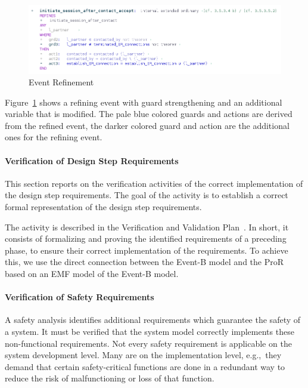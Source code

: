 \begin{figure}[ht]
  \centering
  \includegraphics[width=.9\textwidth]{figures/EventRefine}
  \caption{Event Refinement}
  \label{fig:event-refine}
\end{figure}

Figure~\ref{fig:event-refine} shows a refining event with guard strengthening
and an additional variable that is modified. The pale blue colored guards and
actions are derived from the refined event, the darker colored guard and action
are the additional ones for the refining event.


\paragraph{Verification of Design Step Requirements}
\label{sec:verif-design-step}

This section reports on the verification activities of the correct
implementation of the design step requirements. The goal of the activity is to
establish a correct formal representation of the design step requirements.

The activity is described in the Verification and Validation
Plan~\cite{vnvplan}.  In short, it consists of formalizing and proving the
identified requirements of a preceding phase, to ensure their correct
implementation of the requirements. To achieve this, we use the direct
connection between the Event-B model and the ProR based on an EMF model of the
Event-B model.


\paragraph{Verification of Safety Requirements}
\label{sec:verif-safety-requ}

A safety analysis identifies additional requirements which guarantee the safety
of a system. It must be verified that the system model correctly implements
these non-functional requirements. Not every safety requirement is applicable on
the system development level. Many are on the implementation level, e.g.,\ they
demand that certain safety-critical functions are done in a redundant way to
reduce the risk of malfunctioning or loss of that function.

